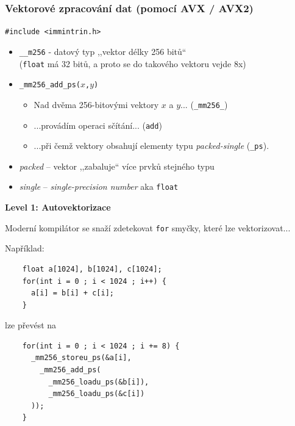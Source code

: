 \documentclass[usenames,dvipsnames,9pt]{beamer}
\begin{document}
\begin{frame}
  \frametitle{Vektorové zpracování dat (pomocí AVX / AVX2)}

  \hfill \texttt{\#include <immintrin.h>}
  \vspace{1em}

  \begin{itemize}
    \item {\large \texttt{\_\_m256} - datový typ ,,vektor délky 256 bitů``} \\
          \hspace{30pt}(\texttt{float} má 32 bitů, a proto se do takového vektoru vejde 8x)
    \pause
    \item {\large \texttt{\_mm256\_add\_ps($x$,$y$)}}
          \begin{itemize}
            \item Nad dvěma 256-bitovými vektory $x$ a $y$... (\texttt{\_mm256\_})
            \item ...provádím operaci sčítání... (\texttt{add})
            \item ...při čemž vektory obsahují elementy typu \emph{packed-single} (\texttt{\_ps}).
          \end{itemize}
    \pause
    \vspace{1em}
    \item \emph{packed} -- vektor ,,zabaluje`` více prvků stejného typu
    \item \emph{single} -- \emph{single-precision number} aka \texttt{float}
  \end{itemize}
\end{frame}

\begin{frame}[fragile]
  \begin{center}
    \LARGE\bf Level 1: Autovektorizace \hspace{10pt} 
  \end{center}
\end{frame}

\begin{frame}[fragile]
  Moderní kompilátor se snaží zdetekovat \texttt{for} smyčky, které lze vektorizovat...

  Například:

  \begin{verbatim}
    float a[1024], b[1024], c[1024];
    for(int i = 0 ; i < 1024 ; i++) {
      a[i] = b[i] + c[i];
    }
  \end{verbatim}

  lze převést na

  \begin{verbatim}
    for(int i = 0 ; i < 1024 ; i += 8) {
      _mm256_storeu_ps(&a[i],
        _mm256_add_ps(
          _mm256_loadu_ps(&b[i]),
          _mm256_loadu_ps(&c[i])
      ));
    }
  \end{verbatim}
\end{frame}
\end{document}
